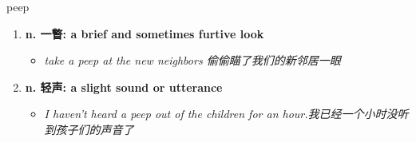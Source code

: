 
\begin{frame}
{\huge peep}
\begin{center}
\begin{enumerate}\Large
  \item \textbf{n. 一瞥: a brief and sometimes furtive look}
  \begin{itemize}
    \item \em{\Large{take a peep at the new neighbors 偷偷瞄了我们的新邻居一眼}}
  \end{itemize}
  \item \textbf{n. 轻声: a slight sound or utterance}
  \begin{itemize}
    \item \em{\Large{I haven't heard a peep out of the children for an hour.我已经一个小时没听到孩子们的声音了}}
  \end{itemize}
\end{enumerate}
\end{center}
\end{frame}

